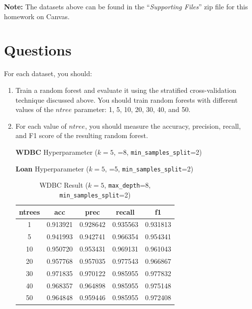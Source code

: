 \documentclass{article}
\begin{document}
\begin{mybox}[boxblue] 
\textbf{Note:} The datasets above can be found in the ``\textit{Supporting Files}'' zip file for this homework on Canvas.
\end{mybox}




\newpage


\vspace{0.7cm}
\section{Questions}

For each dataset, you should:

\begin{enumerate}
    \item Train a random forest and evaluate it using the stratified cross-validation technique discussed above. You should train random forests with different values of the $ntree$ parameter: 1, 5, 10, 20, 30, 40, and 50.

    \item For each value of $ntree$, you should measure the accuracy, precision, recall, and F1 score of the resulting random forest. 

\noindent \textbf{WDBC} Hyperparameter ($k=5$, =8, \texttt{min\_samples\_split}=2)

\noindent \textbf{Loan} Hyperparameter ($k=5$, =5, \texttt{min\_samples\_split}=2)
    
\begin{table}[htbp]
\centering
\caption{WDBC Result ($k=5$, \texttt{max\_depth}=8, \texttt{min\_samples\_split}=2)}
\label{tab:wdbc_result}
\begin{tabular}{ccccc}
\toprule
ntrees & acc & prec & recall & f1 \\
\midrule
1  & 0.913921 & 0.928642 & 0.935563 & 0.931813 \\
5  & 0.941993 & 0.942741 & 0.966354 & 0.954341 \\
10 & 0.950720 & 0.953431 & 0.969131 & 0.961043 \\
20 & 0.957768 & 0.957035 & 0.977543 & 0.966867 \\
30 & 0.971835 & 0.970122 & 0.985955 & 0.977832 \\
40 & 0.968357 & 0.964898 & 0.985955 & 0.975148 \\
50 & 0.964848 & 0.959446 & 0.985955 & 0.972408 \\
\bottomrule
\end{tabular}
\end{table}


\end{enumerate}
\end{document}
